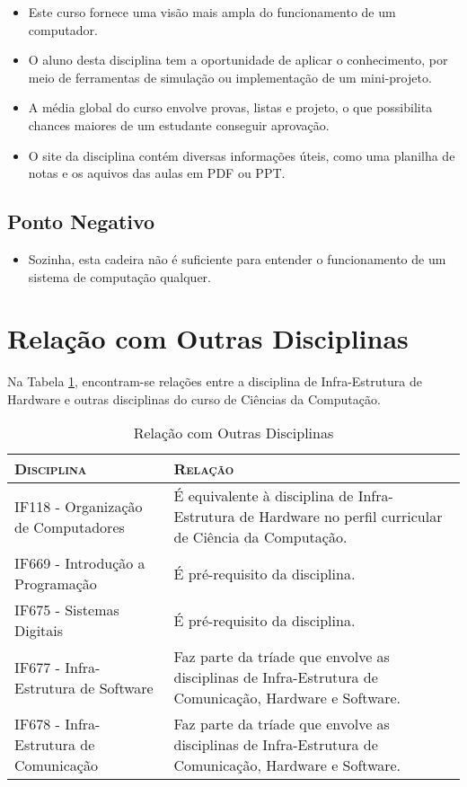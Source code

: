 \documentclass[10pt]{article}
\begin{document}
\begin{itemize}
    \item Este curso fornece uma visão mais ampla do funcionamento de um computador.
    \item O aluno desta disciplina tem a oportunidade de aplicar o conhecimento, por meio de ferramentas de simulação ou implementação de um mini-projeto.
    \item A média global do curso envolve provas, listas e projeto, o que possibilita chances maiores de um estudante conseguir aprovação.
    \item O site da disciplina contém diversas informações úteis, como uma planilha de notas e os aquivos das aulas em PDF ou PPT.
\end{itemize}

\subsection{Ponto Negativo}

\begin{itemize}
    \item Sozinha, esta cadeira não é suficiente para entender o funcionamento de um sistema de computação qualquer.
\end{itemize}

\section{Relação com Outras Disciplinas}

Na Tabela \ref{tab:connections}, encontram-se relações entre a disciplina de Infra-Estrutura de Hardware e outras disciplinas do curso de Ciências da Computação.

\begin{table}[!htb]
    \centering
    \begin{tabular}{|l|p{}|}
    \hline
    \textbf{\textsc{Disciplina}} & \textbf{\textsc{Relação}} \\ \hline
    IF118 - Organização de Computadores & É equivalente à disciplina de Infra-Estrutura de Hardware no perfil curricular de Ciência da Computação. \\ \hline
    IF669 - Introdução a Programação & É pré-requisito da disciplina. \\ \hline
    IF675 - Sistemas Digitais & É pré-requisito da disciplina. \\ \hline
    IF677 - Infra-Estrutura de Software & Faz parte da tríade que envolve as disciplinas de Infra-Estrutura de Comunicação, Hardware e Software. \\ \hline
    IF678 - Infra-Estrutura de Comunicação & Faz parte da tríade que envolve as disciplinas de Infra-Estrutura de Comunicação, Hardware e Software. \\ \hline
    \end{tabular}
    \caption{Relação com Outras Disciplinas}
    \label{tab:connections}
\end{table}



\end{document}
